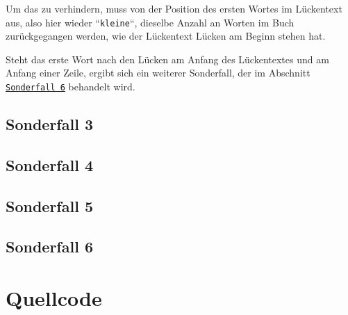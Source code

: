 \documentclass[a4paper, 10pt, ngerman]{scrartcl}
\begin{document}
Um das zu verhindern,
muss von der Position des ersten Wortes im Lückentext aus,
also hier wieder ``\texttt{kleine}``,
dieselbe Anzahl an Worten im Buch zurückgegangen werden,
wie der Lückentext Lücken am Beginn stehen hat.

Steht das erste Wort nach den Lücken am Anfang des Lückentextes und am Anfang einer Zeile,
ergibt sich ein weiterer Sonderfall,
der im Abschnitt \hyperref[sec:sechsterSonderfall]{\texttt{Sonderfall 6}} behandelt wird.

\subsection{Sonderfall 3}\label{sec:dritterSonderfall}

\subsection{Sonderfall 4}\label{sec:vierterSonderfall}

\subsection{Sonderfall 5}\label{sec:fuenfterSonderfall}

\subsection{Sonderfall 6}\label{sec:sechsterSonderfall}

\clearpage


\section{Quellcode}\label{sec:quellcode}
\end{document}
